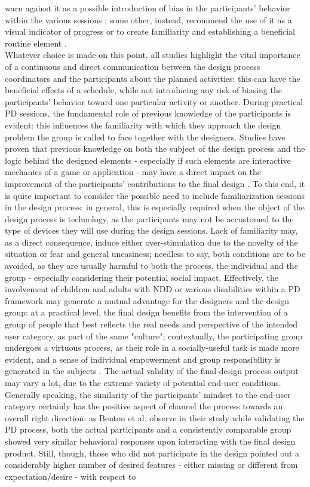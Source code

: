warn against it as a possible introduction of bias in the participants' behavior within the various sessions \cite{Malinverni}; some other, instead, recommend the use of it as a visual indicator of progress \cite{Benton2} or to create familiarity and establishing a beneficial routine element \cite{Benton}.\\
Whatever choice is made on this point, all studies highlight the vital importance of a continuous and direct communication between the design process coordinators and the participants about the planned activities: this can have the beneficial effects of a schedule, while not introducing any risk of biasing the participants' behavior toward one particular activity or another.
During practical PD sessions, the fundamental role of previous knowledge of the participants is evident: this influences the familiarity with which they approach the design problem the group is called to face together with the designers. Studies have proven that previous knowledge on both the subject of the design process and the logic behind the designed elements - especially if such elements are interactive mechanics of a game or application - may have a direct impact on the improvement of the participants' contributions to the final design \cite{Malinverni}. To this end, it is quite important to consider the possible need to include familiarization sessions in the design process: in general, this is especially required when the object of the design process is technology, as the participants may not be accustomed to the type of devices they will use during the design sessions. Lack of familiarity may, as a direct consequence, induce either over-stimulation due to the novelty of the situation or fear and general uneasiness; needless to say, both conditions are to be avoided, as they are usually harmful to both the process, the individual and the group - especially considering their potential social impact. Effectively, the involvement of children and adults with NDD or various disabilities within a PD framework may generate a mutual advantage for the designers and the design group: at a practical level, the final design benefits from the intervention of a group of people that best reflects the real needs and perspective of the intended user category, as part of the same "culture"; contextually, the participating group undergoes a virtuous process, as their role in a socially-useful task is made more evident, and a sense of individual empowerment and group responsibility is generated in the subjects \cite{Malinverni}. The actual validity of the final design process output may vary a lot, due to the extreme variety of potential end-user conditions. Generally speaking, the similarity of the participants' mindset to the end-user category certainly has the positive aspect of channel the process towards an overall right direction: as Benton et al. observe in their study while validating the PD process, both the actual participants and a consistently comparable group showed very similar behavioral responses upon interacting with the final design product. Still, though, those who did not participate in the design pointed out a considerably higher number of desired features - either missing or different from expectation/desire - with respect to 